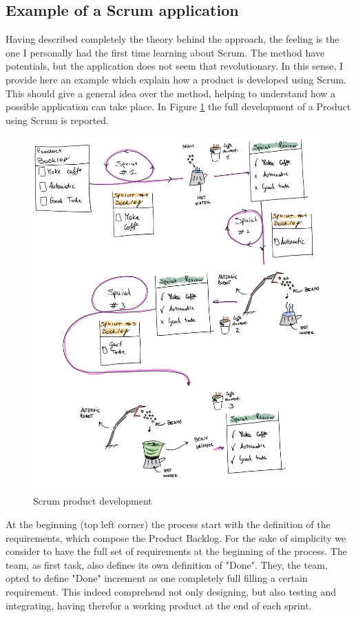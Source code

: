 \documentclass[../main.tex]{subfiles}
\begin{document}
\subsection{Example of a Scrum application}
Having described completely the theory behind the approach, the feeling is the one I personally had the first time learning about Scrum. The method have potentials, but the application does not seem that revolutionary. In this sense, I provide here an example which explain how a product is developed using Scrum. This should give a general idea over the method, helping to understand how a possible application can take place. In Figure \ref{fig:scrumprddev} the full development of a Product using Scrum is reported.
\begin{figure}[htp]
    \centering
    \includegraphics[width=\linewidth]{images_folder/scrum.png}
    \caption{Scrum product development}
    \label{fig:scrumprddev}
\end{figure}
At the beginning (top left corner) the process start with the definition of the requirements, which compose the Product Backlog. For the sake of simplicity we consider to have the full set of requirements at the beginning of the process. The team, as first task, also defines its own definition of "Done". They,  the team, opted to define "Done" increment as one completely full filling a certain requirement. This indeed comprehend not only designing, but also testing and integrating, having therefor a working product at the end of each sprint.\\
\end{document}
